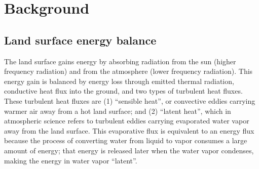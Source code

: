 \section{Background}

\subsection{Land surface energy balance}

The land surface gains energy by absorbing radiation from the sun (higher frequency radiation) and from the atmosphere (lower frequency radiation).  This energy gain is balanced by energy loss through emitted thermal radiation, conductive heat flux into the ground, and two types of turbulent heat fluxes.  These turbulent heat fluxes are (1) ``sensible heat'', or convective eddies carrying warmer air away from a hot land surface; and (2) ``latent heat'', which in atmospheric science refers to turbulent eddies carrying evaporated water vapor away from the land surface.  This evaporative flux is equivalent to an energy flux because the process of converting water from liquid to vapor consumes a large amount of energy; that energy is released later when the water vapor condenses, making the energy in water vapor ``latent''.

